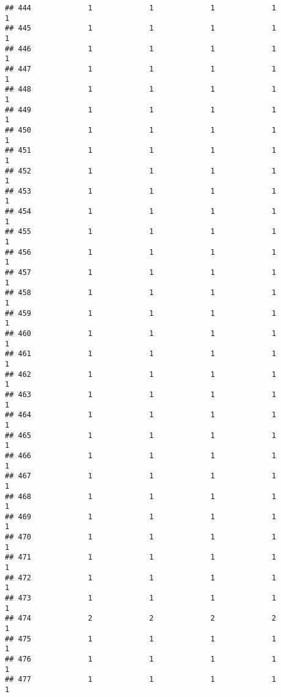 \documentclass[
]{article}
\begin{document}
\begin{verbatim}
## 444             1             1             1             1             1
## 445             1             1             1             1             1
## 446             1             1             1             1             1
## 447             1             1             1             1             1
## 448             1             1             1             1             1
## 449             1             1             1             1             1
## 450             1             1             1             1             1
## 451             1             1             1             1             1
## 452             1             1             1             1             1
## 453             1             1             1             1             1
## 454             1             1             1             1             1
## 455             1             1             1             1             1
## 456             1             1             1             1             1
## 457             1             1             1             1             1
## 458             1             1             1             1             1
## 459             1             1             1             1             1
## 460             1             1             1             1             1
## 461             1             1             1             1             1
## 462             1             1             1             1             1
## 463             1             1             1             1             1
## 464             1             1             1             1             1
## 465             1             1             1             1             1
## 466             1             1             1             1             1
## 467             1             1             1             1             1
## 468             1             1             1             1             1
## 469             1             1             1             1             1
## 470             1             1             1             1             1
## 471             1             1             1             1             1
## 472             1             1             1             1             1
## 473             1             1             1             1             1
## 474             2             2             2             2             1
## 475             1             1             1             1             1
## 476             1             1             1             1             1
## 477             1             1             1             1             1

\end{verbatim}
\end{document}
